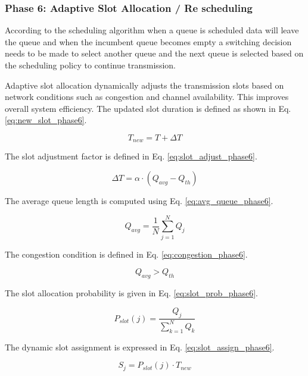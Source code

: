\documentclass[a4paper,fleqn]{cas-dc}
\numberwithin{equation}{section}
\begin{document}
\subsubsection{Phase 6: Adaptive Slot Allocation / Re scheduling}

According to the scheduling algorithm when a queue is scheduled data will leave the queue and when the incumbent queue becomes empty a switching decision needs to be made to select another queue and the next queue is selected based on the scheduling policy to continue transmission. 

Adaptive slot allocation dynamically adjusts the transmission slots based on network conditions such as congestion and channel availability. This improves overall system efficiency. The updated slot duration is defined as shown in Eq. \ref{eq:new_slot_phase6}.

\begin{equation}
T_{new} = T + \Delta T
\label{eq:new_slot_phase6}
\end{equation}

The slot adjustment factor is defined in Eq. \ref{eq:slot_adjust_phase6}.

\begin{equation}
\Delta T = \alpha \cdot (Q_{avg} - Q_{th})
\label{eq:slot_adjust_phase6}
\end{equation}

The average queue length is computed using Eq. \ref{eq:avg_queue_phase6}.

\begin{equation}
Q_{avg} = \frac{1}{N} \sum_{j=1}^{N} Q_j
\label{eq:avg_queue_phase6}
\end{equation}

The congestion condition is defined in Eq. \ref{eq:congestion_phase6}.

\begin{equation}
Q_{avg} > Q_{th}
\label{eq:congestion_phase6}
\end{equation}

The slot allocation probability is given in Eq. \ref{eq:slot_prob_phase6}.

\begin{equation}
P_{slot}(j) = \frac{Q_j}{\sum_{k=1}^{N} Q_k}
\label{eq:slot_prob_phase6}
\end{equation}

The dynamic slot assignment is expressed in Eq. \ref{eq:slot_assign_phase6}.

\begin{equation}
S_j = P_{slot}(j) \cdot T_{new}
\label{eq:slot_assign_phase6}
\end{equation}
\end{document}
